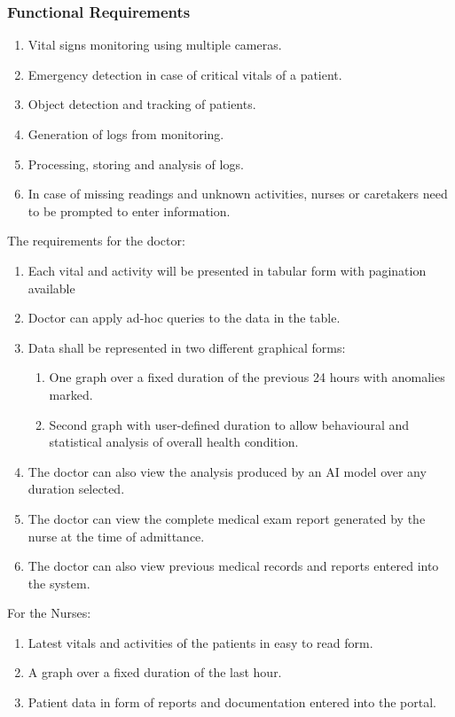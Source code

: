 \subsubsection{Functional Requirements}
\begin{enumerate}
    \item Vital signs monitoring using multiple cameras.
    \item Emergency detection in case of critical vitals of a patient.
    \item Object detection and tracking of patients.
    \item Generation of logs from monitoring.
    \item Processing, storing and analysis of logs.
    \item In case of missing readings and unknown activities, nurses or caretakers need to be prompted to enter information.
\end{enumerate}
The requirements for the doctor:
\begin{enumerate}
     \item Each vital and activity will be presented in tabular form with pagination available
     \item Doctor can apply ad-hoc queries to the data in the table.
     \item Data shall be represented in two different graphical forms:
    \begin{enumerate}
        \item One graph over a fixed duration of the previous 24 hours with anomalies marked.
        \item Second graph with user-defined duration to allow behavioural and statistical analysis of overall health condition.
    \end{enumerate}
    \item The doctor can also view the analysis produced by an AI model over any duration selected.
    \item The doctor can view the complete medical exam report generated by the nurse at the time of admittance.
    \item The doctor can also view previous medical records and reports entered into the system.
\end{enumerate}
For the Nurses:
\begin{enumerate}
    \item Latest vitals and activities of the patients in easy to read form.
    \item A graph over a fixed duration of the last hour.
    \item Patient data in form of reports and documentation entered into the portal.
\end{enumerate}
